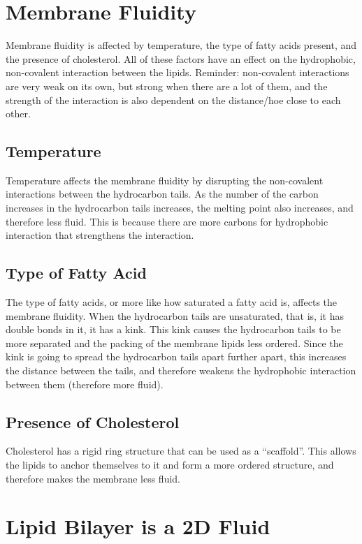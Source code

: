 \section{Membrane Fluidity}

Membrane fluidity is affected by temperature, the type of fatty acids present, and the presence of cholesterol.
All of these factors have an effect on the hydrophobic, non-covalent interaction between the lipids.
Reminder: non-covalent interactions are very weak on its own, but strong when there are a lot of them, and the strength of the interaction is also dependent on the distance/hoe close to each other.

\subsection{Temperature}

Temperature affects the membrane fluidity by disrupting the non-covalent interactions between the hydrocarbon tails.
As the number of the carbon increases in the hydrocarbon tails increases, the melting point also increases, and therefore less fluid.
This is because there are more carbons for hydrophobic interaction that strengthens the interaction.

\subsection{Type of Fatty Acid}

The type of fatty acids, or more like how saturated a fatty acid is, affects the membrane fluidity.
When the hydrocarbon tails are unsaturated, that is, it has double bonds in it, it has a kink.
This kink causes the hydrocarbon tails to be more separated and the packing of the membrane lipids less ordered.
Since the kink is going to spread the hydrocarbon tails apart further apart, this increases the distance between the tails, and therefore weakens the hydrophobic interaction between them (therefore more fluid).

\subsection{Presence of Cholesterol}

Cholesterol has a rigid ring structure that can be used as a ``scaffold''.
This allows the lipids to anchor themselves to it and form a more ordered structure, and therefore makes the membrane less fluid.

\section{Lipid Bilayer is a 2D Fluid}

